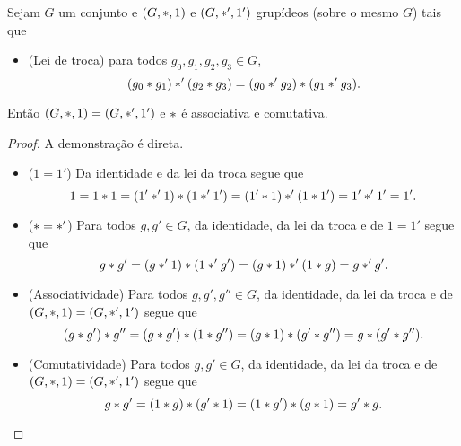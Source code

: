 \begin{proposition}
Sejam $G$ um conjunto e $(G,\ast,1)$ e $(G,\ast',1')$ grupídeos (sobre o mesmo $G$) tais que
	\begin{itemize}
		\item (Lei de troca) para todos $g_0,g_1,g_2,g_3 \in G$,
	\begin{equation*}
	(g_0 \ast g_1) \ast' (g_2 \ast g_3) = (g_0 \ast' g_2) \ast (g_1 \ast' g_3).
	\end{equation*}
	\end{itemize}
Então $(G,\ast,1) = (G,\ast',1')$ e $\ast$ é associativa e comutativa.
\end{proposition}
\begin{proof}
A demonstração é direta.
	\begin{itemize}
		\item ($1=1'$) Da identidade e da lei da troca segue que
		\begin{equation*}
		1 = 1 \ast 1 = (1' \ast' 1) \ast (1 \ast' 1') = (1' \ast 1) \ast' (1 \ast 1') = 1' \ast' 1' = 1'.
		\end{equation*}

		\item ($\ast = \ast'$) Para todos $g,g' \in G$, da identidade, da lei da troca e de $1=1'$ segue que
		\begin{equation*}
		g \ast g' = (g \ast' 1) \ast (1 \ast' g') = (g \ast 1) \ast' (1 \ast g) = g \ast' g'.
		\end{equation*}

		\item (Associatividade) Para todos $g,g',g'' \in G$, da identidade, da lei da troca e de $(G,\ast,1) = (G,\ast',1')$ segue que
		\begin{equation*}
		(g \ast g') \ast g'' = (g \ast g') \ast (1 \ast g'') = (g \ast 1) \ast (g' \ast g'') = g \ast (g' \ast g'').
		\end{equation*}

		\item (Comutatividade) Para todos $g,g' \in G$, da identidade, da lei da troca e de $(G,\ast,1) = (G,\ast',1')$ segue que
		\begin{equation*}
		g \ast g' = (1 \ast g) \ast (g' \ast 1) = (1 \ast g') \ast (g \ast 1) = g' \ast g.
		\qedhere
		\end{equation*}
	\end{itemize}
\end{proof}

